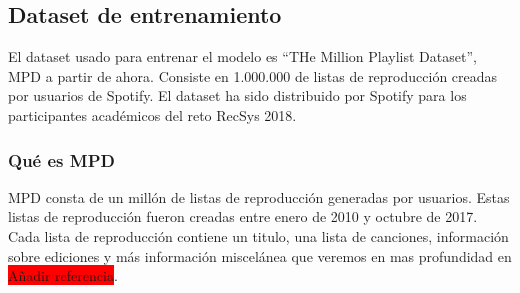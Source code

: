\documentclass{article}
\begin{document}
	\subsection{Dataset de entrenamiento}
	El dataset usado para entrenar el modelo es ``THe Million Playlist Dataset'', MPD a partir de ahora. Consiste en 1.000.000 de listas de reproducción creadas por usuarios de Spotify. El dataset ha sido distribuido por Spotify para los participantes académicos del reto RecSys 2018.
	\subsubsection{Qué es MPD}
	MPD consta de un millón de listas de reproducción generadas por usuarios. Estas listas de reproducción fueron creadas entre enero de 2010 y octubre de 2017. Cada lista de reproducción contiene un titulo, una lista de canciones, información sobre ediciones y más información miscelánea que veremos en mas profundidad en  \colorbox{red}{Añadir referencia}.
\end{document}
